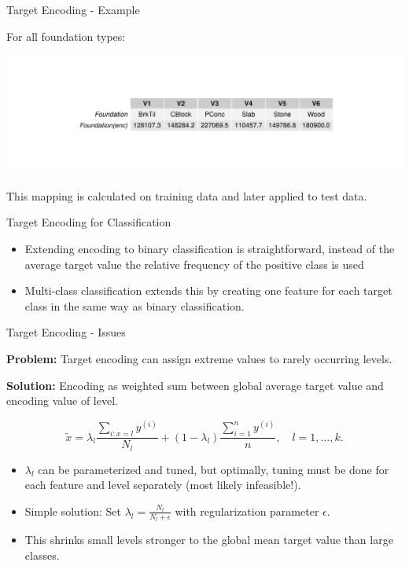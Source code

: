 \documentclass[11pt,compress,t,notes=noshow, xcolor=table]{beamer}
\begin{document}
\begin{vbframe}{Target Encoding - Example}

For all foundation types:

\vfill

\begin{center}
\includegraphics[width = \textwidth]{figure/foundation_encoding_table.pdf}
\end{center}

\vfill

This mapping is calculated on training data and later applied to test
data.


\end{vbframe}


\begin{vbframe}{Target Encoding for Classification}

\begin{itemize}
    \item Extending encoding to binary classification is straightforward,
 instead of the average target value the relative frequency of the
 positive class is used
    \item Multi-class classification extends this by creating one feature for
 each target class in the same way as binary classification.

\end{itemize}
\end{vbframe}


\begin{vbframe}{Target Encoding - Issues}

\textbf{Problem:} Target encoding can assign extreme values to rarely occurring levels.

\textbf{Solution:} Encoding as weighted sum between global average target value and encoding value of level.

$$\tilde x = \lambda_l\frac{\sum_{i:x=l}y^{(i)}}{N_l} + (1-\lambda_l)\frac{\sum_{i=1}^n y^{(i)}}{n}, \quad l=1,\dots,k.$$

\begin{itemize}
    \item $\lambda_l$ can be parameterized and tuned, but optimally, tuning must be done for each feature and level separately (most likely infeasible!).
    \item Simple solution: Set $\lambda_l=\frac{N_l}{N_l+\epsilon}$ with regularization parameter $\epsilon$.
    \item This shrinks small levels stronger to the global mean target value than large classes.
\end{itemize}



\end{vbframe}
\end{document}
